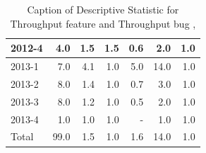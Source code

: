 \documentclass[UKenglish]{ifimaster}  %
\begin{document}
\begin{table}[!htbp]
\begin{adjustwidth}{-2.5cm}{}
{{\begin{tabular}{ | l | r | r | r | r | r | r | }
2012-4 & 4.0 & 1.5 & 1.5 & 0.6 & 2.0 & 1.0\\ \hline
2013-1 & 7.0 & 4.1 & 1.0 & 5.0 & 14.0 & 1.0\\ \hline
2013-2 & 8.0 & 1.4 & 1.0 & 0.7 & 3.0 & 1.0\\ \hline
2013-3 & 8.0 & 1.2 & 1.0 & 0.5 & 2.0 & 1.0\\ \hline
2013-4 & 1.0 & 1.0 & 1.0 & - & 1.0 & 1.0\\ \hline
Total & 99.0 & 1.5 & 1.0 & 1.6 & 14.0 & 1.0\\ \hline
\end{tabular}
}
}
\end{adjustwidth}
\caption[Optional caption for list of figures]{Caption of Descriptive Statistic for Throughput feature and Throughput bug  , }
\label{DS:8:2}
\end{table}
\end{document}
